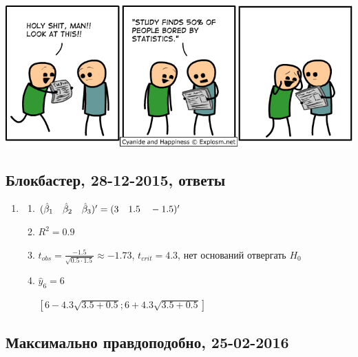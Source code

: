 \documentclass[12pt, a4paper]{article}\usepackage[]{graphicx}\usepackage[]{color}
\begin{document}
\begin{center}
\includegraphics[scale=0.6]{figures/50_bored.png}
\end{center}


\subsection{Блокбастер, 28-12-2015, ответы}

\begin{enumerate}
\item
\begin{enumerate}
\item $(\hat{\beta}_1 \quad \hat{\beta}_2 \quad \hat{\beta}_3)' = (3 \quad 1.5 \quad -1.5)'$
\item $R^2=0.9$
\item $t_{obs} = \frac{-1.5}{\sqrt{0.5\cdot1.5}} \approx -1.73$, $t_{crit} = 4.3$, нет оснований отвергать $H_0$
\item $\hat y_6 = 6$

$[6 - 4.3\sqrt{3.5 + 0.5}; 6 + 4.3\sqrt{3.5+0.5}]$
\end{enumerate}
\end{enumerate}


\subsection{Максимально правдоподобно, 25-02-2016}
\end{document}
